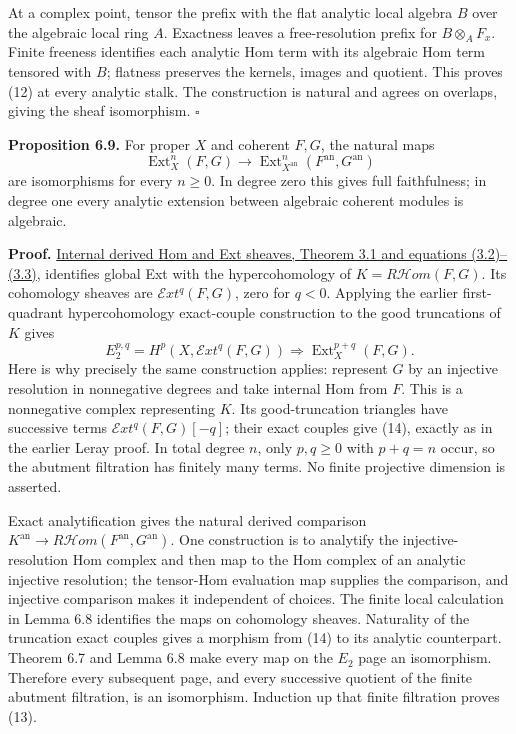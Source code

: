 \documentclass[11pt]{article}
\begin{document}
At a complex point, tensor the prefix with the flat analytic local
algebra \(B\) over the algebraic local ring \(A\). Exactness leaves a
free-resolution prefix for \(B\otimes_A F_x\). Finite freeness
identifies each analytic Hom term with its algebraic Hom term tensored
with \(B\); flatness preserves the kernels, images and quotient. This
proves (12) at every analytic stalk. The construction is natural and
agrees on overlaps, giving the sheaf isomorphism. \(\square\)

\textbf{Proposition 6.9.} For proper \(X\) and coherent \(F,G\), the
natural maps \[
\operatorname{Ext}^n_X(F,G)\longrightarrow
\operatorname{Ext}^n_{X^{\mathrm{an}}}(F^{\mathrm{an}},G^{\mathrm{an}})
\tag{13}
\] are isomorphisms for every \(n\ge0\). In degree zero this gives full
faithfulness; in degree one every analytic extension between algebraic
coherent modules is algebraic.

\textbf{Proof.}
\href{../derived-categories-and-sheaf-operations/internal-derived-hom-and-ext-sheaves.html\#3-adjunction-local-maps-and-ext}{Internal
derived Hom and Ext sheaves, Theorem 3.1 and equations (3.2)--(3.3)},
identifies global Ext with the hypercohomology of
\(K=R\mathcal Hom(F,G)\). Its cohomology sheaves are
\(\mathcal Ext^q(F,G)\), zero for \(q<0\). Applying the earlier
first-quadrant hypercohomology exact-couple construction to the good
truncations of \(K\) gives \[
E_2^{p,q}=H^p(X,\mathcal Ext^q(F,G))
\Longrightarrow\operatorname{Ext}^{p+q}_X(F,G).
\tag{14}
\] Here is why precisely the same construction applies: represent \(G\)
by an injective resolution in nonnegative degrees and take internal Hom
from \(F\). This is a nonnegative complex representing \(K\). Its
good-truncation triangles have successive terms
\(\mathcal Ext^q(F,G)[-q]\); their exact couples give (14), exactly as
in the earlier Leray proof. In total degree \(n\), only \(p,q\ge0\) with
\(p+q=n\) occur, so the abutment filtration has finitely many terms. No
finite projective dimension is asserted.

Exact analytification gives the natural derived comparison
\(K^{\mathrm{an}}\to R\mathcal Hom(F^{\mathrm{an}},G^{\mathrm{an}})\).
One construction is to analytify the injective-resolution Hom complex
and then map to the Hom complex of an analytic injective resolution; the
tensor-Hom evaluation map supplies the comparison, and injective
comparison makes it independent of choices. The finite local calculation
in Lemma 6.8 identifies the maps on cohomology sheaves. Naturality of
the truncation exact couples gives a morphism from (14) to its analytic
counterpart. Theorem 6.7 and Lemma 6.8 make every map on the \(E_2\)
page an isomorphism. Therefore every subsequent page, and every
successive quotient of the finite abutment filtration, is an
isomorphism. Induction up that finite filtration proves (13).
\end{document}
